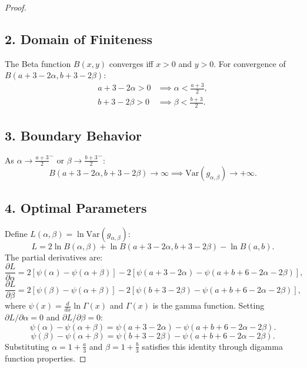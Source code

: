 \documentclass{article}
\theoremstyle{plain}
\theoremstyle{definition}
\theoremstyle{remark}
\begin{document}
\begin{proof}
\subsection*{2. Domain of Finiteness}
The Beta function \( B(x,y) \) converges iff \( x > 0 \) and \( y > 0 \). For convergence of \( B(a + 3 - 2\alpha, b + 3 - 2\beta) \):
\begin{align*}
    a + 3 - 2\alpha > 0 &\implies \alpha < \frac{a + 3}{2}, \\
    b + 3 - 2\beta > 0 &\implies \beta < \frac{b + 3}{2}.
\end{align*}

\subsection*{3. Boundary Behavior}
As \( \alpha \to \frac{a + 3}{2}^- \) or \( \beta \to \frac{b + 3}{2}^- \):
\begin{equation*}
    B(a + 3 - 2\alpha, b + 3 - 2\beta) \to \infty \implies \mathrm{Var}(g_{\alpha,\beta}) \to +\infty.
\end{equation*}

\subsection*{4. Optimal Parameters}
Define \( L(\alpha,\beta) = \ln \mathrm{Var}(g_{\alpha,\beta}) \):
\begin{equation*}
    L =  2\ln B(\alpha,\beta) + \ln B(a + 3 - 2\alpha, b + 3 - 2\beta) - \ln B(a,b).
\end{equation*}
The partial derivatives are:
\begin{equation*}
    \frac{\partial L}{\partial \alpha} = 2\left[\psi(\alpha) - \psi(\alpha + \beta)\right] - 2\left[\psi(a + 3 - 2\alpha) - \psi(a + b + 6 - 2\alpha - 2\beta)\right],
\end{equation*}
\begin{equation*}
    \frac{\partial L}{\partial \beta} = 2\left[\psi(\beta) - \psi(\alpha + \beta)\right] - 2\left[\psi(b + 3 - 2\beta) - \psi(a + b + 6 - 2\alpha - 2\beta)\right],
\end{equation*}
where \( \psi(x) = \frac{d}{dx}\ln \Gamma(x) \) and $\Gamma(x)$ is the gamma function. Setting \( \partial L/\partial \alpha = 0 \) and \( \partial L/\partial \beta = 0 \):
\begin{equation*}
    \psi(\alpha) - \psi(\alpha + \beta) = \psi(a + 3 - 2\alpha) - \psi(a + b + 6 - 2\alpha - 2\beta).
\end{equation*}
\begin{equation*}
    \psi(\beta) - \psi(\alpha + \beta) = \psi(b + 3 - 2\beta) - \psi(a + b + 6 - 2\alpha - 2\beta).
\end{equation*}
Substituting \( \alpha = 1 + \frac{a}{3} \) and \( \beta = 1 + \frac{b}{3} \) satisfies this identity through digamma function properties.


\end{proof}
\end{document}
